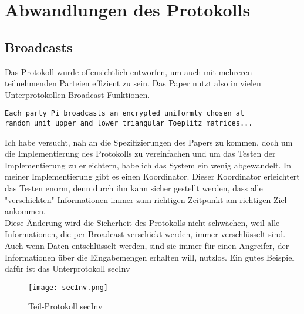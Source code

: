 \section{Abwandlungen des Protokolls} \label{Änderungen}
\subsection{Broadcasts}
Das Protokoll wurde offensichtlich entworfen, um auch mit mehreren teilnehmenden Parteien effizient zu sein.
Das Paper \cite{Doettling2021} nutzt also in vielen Unterprotokollen Broadcast-Funktionen.

\begin{lstlisting}[firstnumber=1, caption = 
Beispiel: Ausschnitt von secRank \cite{Doettling2021}]
Each party Pi broadcasts an encrypted uniformly chosen at
random unit upper and lower triangular Toeplitz matrices...
\end{lstlisting}

Ich habe versucht, nah an die Spezifizierungen des Papers zu kommen, doch 
um die Implementierung des Protokolls zu vereinfachen und um das Testen der Implementierung zu erleichtern, habe ich das System ein wenig abgewandelt. In meiner Implementierung gibt es einen Koordinator. Dieser Koordinator erleichtert das Testen enorm, denn durch ihn kann sicher gestellt werden, dass alle "verschickten" Informationen immer zum richtigen Zeitpunkt am richtigen Ziel ankommen.\\
Diese Änderung wird die Sicherheit des Protokolls nicht schwächen, weil alle Informationen, die per Broadcast verschickt werden, immer verschlüsselt sind.
Auch wenn Daten entschlüsselt werden, sind sie immer für einen Angreifer, der Informationen über die Eingabemengen erhalten will, nutzlos. Ein gutes Beispiel dafür ist das Unterprotokoll secInv \\

\begin{figure}[h]
\begin{center}
\texttt{[image: secInv.png]}
\caption{Teil-Protokoll secInv}
\cite{Doettling2021}
\label{oInv}
\end{center}

\end{figure}

